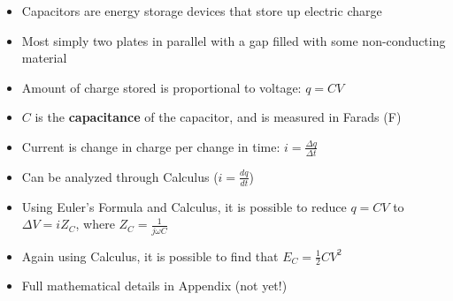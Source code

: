 \begin{itemize}
\item Capacitors are energy storage devices that store up electric charge
\item Most simply two plates in parallel with a gap filled with some non-conducting material
\item Amount of charge stored is proportional to voltage: $q=CV$
\item $C$ is the {\bf capacitance} of the capacitor, and is measured in Farads (F)
\item Current is change in charge per change in time: $i = \frac{\Delta q}{\Delta t}$
\item Can be analyzed through Calculus ($i = \frac{d q}{d t}$)
\item Using Euler's Formula and Calculus, it is possible to reduce $q=CV$ to $\Delta V=iZ_C$, where $Z_C=\frac{1}{j\omega C}$
\item Again using Calculus, it is possible to find that $E_C=\frac{1}{2}CV^2$
\item Full mathematical details in Appendix (not yet!)
\end{itemize}
